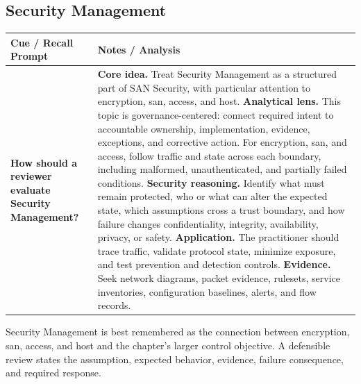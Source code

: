 \documentclass[11pt]{article}
\newcommand{\CornellHeader}{%
\rowcolor{Navy}\color{white}\bfseries Cue / Recall Prompt & \color{white}\bfseries Notes / Analysis\\\hline}
\newcommand{\CornellRow}[2]{%
\cellcolor{CueGray}\RaggedRight\textbf{#1} & \RaggedRight #2\\\hline}
\begin{document}
\subsection*{Security Management}
\begin{longtable}{>{\RaggedRight\arraybackslash}p{}|>{\RaggedRight\arraybackslash}p{}}
\CornellHeader
\CornellRow{How should a reviewer evaluate Security Management?}{\textbf{Core idea.} Treat Security Management as a structured part of SAN Security, with particular attention to encryption, san, access, and host. \textbf{Analytical lens.} This topic is governance-centered: connect required intent to accountable ownership, implementation, evidence, exceptions, and corrective action. For encryption, san, and access, follow traffic and state across each boundary, including malformed, unauthenticated, and partially failed conditions. \textbf{Security reasoning.} Identify what must remain protected, who or what can alter the expected state, which assumptions cross a trust boundary, and how failure changes confidentiality, integrity, availability, privacy, or safety. \textbf{Application.} The practitioner should trace traffic, validate protocol state, minimize exposure, and test prevention and detection controls. \textbf{Evidence.} Seek network diagrams, packet evidence, rulesets, service inventories, configuration baselines, alerts, and flow records.}
\end{longtable}
\begin{topicsummary}
Security Management is best remembered as the connection between encryption, san, access, and host and the chapter's larger control objective. A defensible review states the assumption, expected behavior, evidence, failure consequence, and required response.
\end{topicsummary}
\end{document}
